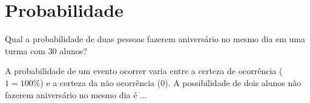 \chapter{Probabilidade}

Qual a probabilidade de duas pessoas fazerem aniversário no mesmo dia em uma turma com 30 alunos?

A probabilidade de um evento ocorrer varia entre a certeza de ocorrência ($1=100\%$) e a certeza da não ocorrência ($0$). A possibilidade de dois alunos não fazerem aniversário no mesmo dia é ...